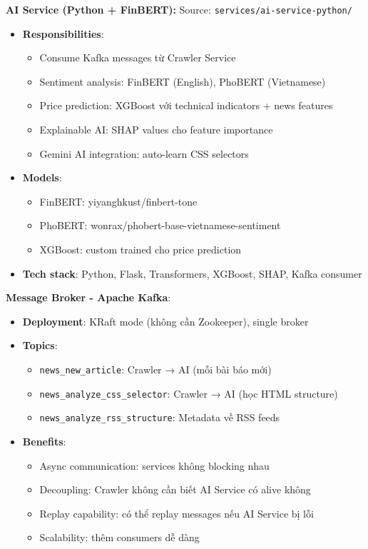 \noindent\textbf{AI Service (Python + FinBERT):}
Source: \texttt{services/ai-service-python/}

\begin{itemize}
    \item \textbf{Responsibilities}:
    \begin{itemize}
        \item Consume Kafka messages từ Crawler Service
        \item Sentiment analysis: FinBERT (English), PhoBERT (Vietnamese)
        \item Price prediction: XGBoost với technical indicators + news features
        \item Explainable AI: SHAP values cho feature importance
        \item Gemini AI integration: auto-learn CSS selectors
    \end{itemize}
    
    \item \textbf{Models}:
    \begin{itemize}
        \item FinBERT: yiyanghkust/finbert-tone
        \item PhoBERT: wonrax/phobert-base-vietnamese-sentiment
        \item XGBoost: custom trained cho price prediction
    \end{itemize}
    
    \item \textbf{Tech stack}: Python, Flask, Transformers, XGBoost, SHAP, Kafka consumer
\end{itemize}

\textbf{Message Broker - Apache Kafka}:
\begin{itemize}
    \item \textbf{Deployment}: KRaft mode (không cần Zookeeper), single broker
    \item \textbf{Topics}:
    \begin{itemize}
        \item \texttt{news\_new\_article}: Crawler → AI (mỗi bài báo mới)
        \item \texttt{news\_analyze\_css\_selector}: Crawler → AI (học HTML structure)
        \item \texttt{news\_analyze\_rss\_structure}: Metadata về RSS feeds
    \end{itemize}
    
    \item \textbf{Benefits}:
    \begin{itemize}
        \item Async communication: services không blocking nhau
        \item Decoupling: Crawler không cần biết AI Service có alive không
        \item Replay capability: có thể replay messages nếu AI Service bị lỗi
        \item Scalability: thêm consumers dễ dàng
    \end{itemize}
\end{itemize}

